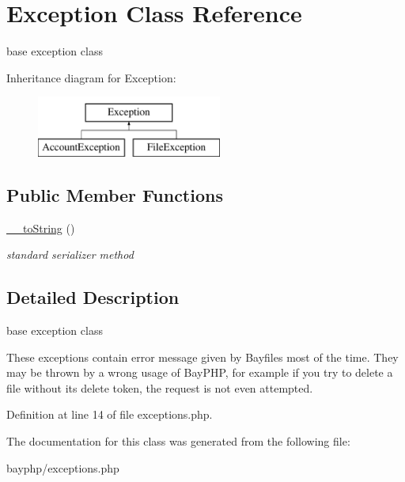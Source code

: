 \hypertarget{classException}{
\section{Exception Class Reference}
\label{classException}
}


base exception class  


Inheritance diagram for Exception:\begin{figure}[H]
\begin{center}
\leavevmode
\includegraphics[height=2.000000cm]{classException}
\end{center}
\end{figure}
\subsection*{Public Member Functions}
\begin{DoxyCompactItemize}
\item 
\hypertarget{classException_a84cb308cbcf072fe19e9e2b8ec83918e}{
\hyperlink{classException_a84cb308cbcf072fe19e9e2b8ec83918e}{\_\-\_\-toString} ()}
\label{classException_a84cb308cbcf072fe19e9e2b8ec83918e}

\begin{DoxyCompactList}\small\item\em standard serializer method \end{DoxyCompactList}\end{DoxyCompactItemize}


\subsection{Detailed Description}
base exception class 

These exceptions contain error message given by Bayfiles most of the time. They may be thrown by a wrong usage of BayPHP, for example if you try to delete a file without its delete token, the request is not even attempted. 

Definition at line 14 of file exceptions.php.



The documentation for this class was generated from the following file:\begin{DoxyCompactItemize}
\item 
bayphp/exceptions.php\end{DoxyCompactItemize}
